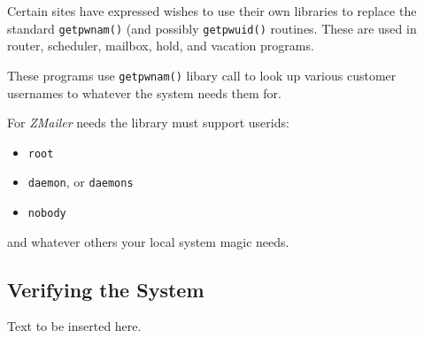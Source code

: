 \begin{description}
Certain sites have expressed wishes to use their own libraries
to replace the standard {\tt getpwnam()} (and possibly {\tt getpwuid()}
routines.
These are used in router, scheduler, mailbox, hold, and vacation
programs.

These programs use {\tt getpwnam()} libary call to look up
various customer usernames to whatever the system needs them
for.

For {\em ZMailer} needs the library must support userids:
\begin{itemize}
\item {\tt root}
\item {\tt daemon}, or {\tt daemons}
\item {\tt nobody}
\end{itemize}
and whatever others your local system magic needs.
\end{description}

\subsection{Verifying the System}

Text to be inserted here.
